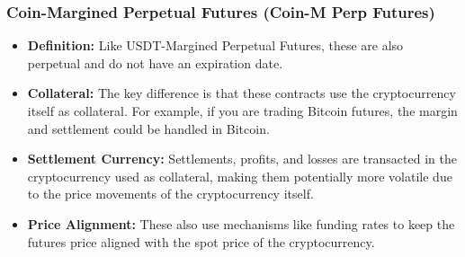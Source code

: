 \documentclass{report}
\begin{document}
    \bigbreak \noindent 
    \subsubsection{Coin-Margined Perpetual Futures (Coin-M Perp Futures)}
    \bigbreak \noindent 
    \begin{itemize}
        \item \textbf{Definition:} Like USDT-Margined Perpetual Futures, these are also perpetual and do not have an expiration date.
        \item \textbf{Collateral:} The key difference is that these contracts use the cryptocurrency itself as collateral. For example, if you are trading Bitcoin futures, the margin and settlement could be handled in Bitcoin.
        \item \textbf{Settlement Currency:} Settlements, profits, and losses are transacted in the cryptocurrency used as collateral, making them potentially more volatile due to the price movements of the cryptocurrency itself.
        \item \textbf{Price Alignment:} These also use mechanisms like funding rates to keep the futures price aligned with the spot price of the cryptocurrency.
    \end{itemize}
\end{document}
